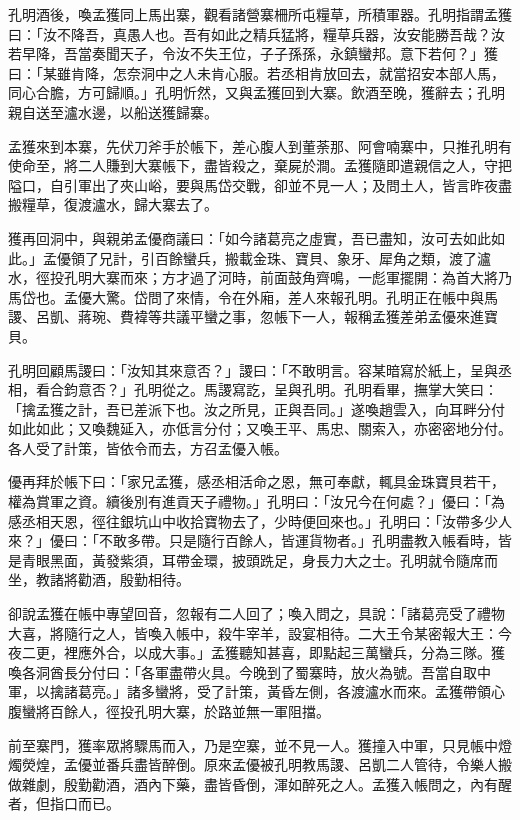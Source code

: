 孔明酒後，喚孟獲同上馬出寨，觀看諸營寨柵所屯糧草，所積軍器。孔明指謂孟獲曰：「汝不降吾，真愚人也。吾有如此之精兵猛將，糧草兵器，汝安能勝吾哉？汝若早降，吾當奏聞天子，令汝不失王位，子子孫孫，永鎮蠻邦。意下若何？」獲曰：「某雖肯降，怎奈洞中之人未肯心服。若丞相肯放回去，就當招安本部人馬，同心合膽，方可歸順。」孔明忻然，又與孟獲回到大寨。飲酒至晚，獲辭去；孔明親自送至瀘水邊，以船送獲歸寨。

孟獲來到本寨，先伏刀斧手於帳下，差心腹人到董荼那、阿會喃寨中，只推孔明有使命至，將二人賺到大寨帳下，盡皆殺之，棄屍於澗。孟獲隨即遣親信之人，守把隘口，自引軍出了夾山峪，要與馬岱交戰，卻並不見一人；及問土人，皆言昨夜盡搬糧草，復渡瀘水，歸大寨去了。

獲再回洞中，與親弟孟優商議曰：「如今諸葛亮之虛實，吾已盡知，汝可去如此如此。」孟優領了兄計，引百餘蠻兵，搬載金珠、寶貝、象牙、犀角之類，渡了瀘水，徑投孔明大寨而來；方才過了河時，前面鼓角齊鳴，一彪軍擺開：為首大將乃馬岱也。孟優大驚。岱問了來情，令在外廂，差人來報孔明。孔明正在帳中與馬謖、呂凱、蔣琬、費褘等共議平蠻之事，忽帳下一人，報稱孟獲差弟孟優來進寶貝。

孔明回顧馬謖曰：「汝知其來意否？」謖曰：「不敢明言。容某暗寫於紙上，呈與丞相，看合鈞意否？」孔明從之。馬謖寫訖，呈與孔明。孔明看畢，撫掌大笑曰：「擒孟獲之計，吾已差派下也。汝之所見，正與吾同。」遂喚趙雲入，向耳畔分付如此如此；又喚魏延入，亦低言分付；又喚王平、馬忠、關索入，亦密密地分付。各人受了計策，皆依令而去，方召孟優入帳。

優再拜於帳下曰：「家兄孟獲，感丞相活命之恩，無可奉獻，輒具金珠寶貝若干，權為賞軍之資。續後別有進貢天子禮物。」孔明曰：「汝兄今在何處？」優曰：「為感丞相天恩，徑往銀坑山中收拾寶物去了，少時便回來也。」孔明曰：「汝帶多少人來？」優曰：「不敢多帶。只是隨行百餘人，皆運貨物者。」孔明盡教入帳看時，皆是青眼黑面，黃發紫須，耳帶金環，披頭跣足，身長力大之士。孔明就令隨席而坐，教諸將勸酒，殷勤相待。

卻說孟獲在帳中專望回音，忽報有二人回了；喚入問之，具說：「諸葛亮受了禮物大喜，將隨行之人，皆喚入帳中，殺牛宰羊，設宴相待。二大王令某密報大王：今夜二更，裡應外合，以成大事。」孟獲聽知甚喜，即點起三萬蠻兵，分為三隊。獲喚各洞酋長分付曰：「各軍盡帶火具。今晚到了蜀寨時，放火為號。吾當自取中軍，以擒諸葛亮。」諸多蠻將，受了計策，黃昏左側，各渡瀘水而來。孟獲帶領心腹蠻將百餘人，徑投孔明大寨，於路並無一軍阻擋。

前至寨門，獲率眾將驟馬而入，乃是空寨，並不見一人。獲撞入中軍，只見帳中燈燭熒煌，孟優並番兵盡皆醉倒。原來孟優被孔明教馬謖、呂凱二人管待，令樂人搬做雜劇，殷勤勸酒，酒內下藥，盡皆昏倒，渾如醉死之人。孟獲入帳問之，內有醒者，但指口而已。

